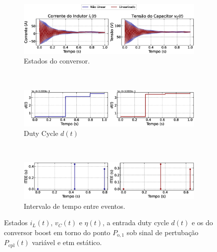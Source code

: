 \begin{figure}[H]
  \centering
  \captionsetup{justification=centering}
  \begin{subfigure}{1.\textwidth}
    \centering
    \includegraphics[width=1.\textwidth]{figuras/dynamic-etm/boost/sim2/op1/result.eps}
    \caption{Estados do conversor.}
    \label{fig:boost_converter_variable_pcpl_dynamic_etm_op1_a}
  \end{subfigure}
  \\[6pt]
  \begin{subfigure}{1.\textwidth}
    \centering
    \includegraphics[width=1.\textwidth]{figuras/dynamic-etm/boost/sim2/op1/duty-cycle.eps}
    \caption{Duty Cycle $d(t)$}
    \label{fig:boost_converter_variable_pcpl_dynamic_etm_op1_b}
  \end{subfigure}
  \\[6pt]
  \begin{subfigure}{1.\textwidth}
    \centering
    \includegraphics[width=1.\textwidth]{figuras/dynamic-etm/boost/sim2/op1/inter-event-times.eps}
    \caption{Intervalo de tempo entre eventos.}
    \label{fig:boost_converter_variable_pcpl_dynamic_etm_op1_c}
  \end{subfigure}
  \caption{Estados $i_L(t)$, $v_C(t)$ e $\eta(t)$, a entrada duty cycle $d(t)$ e os  do conversor boost em torno do ponto $P_{\mathrm{o}, 1}$ sob sinal de pertubação $P_{\mathrm{cpl}}(t)$ variável e \acrshort{etm} estático.}
  \label{fig:boost_converter_variable_pcpl_dynamic_etm_op1}
\end{figure}

